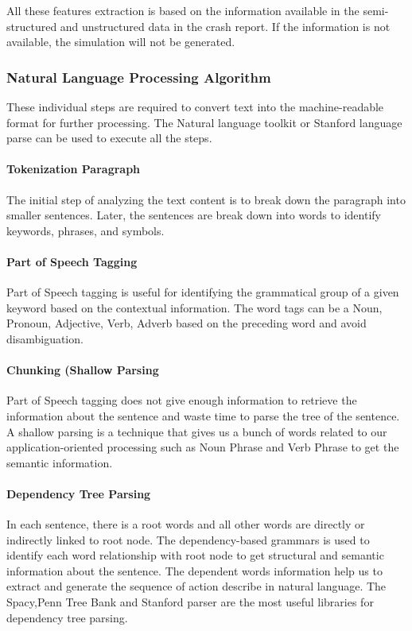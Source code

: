 All these features extraction is based on the information available in the semi-structured and unstructured data in the crash report. If the information is not available, the simulation will not be generated.

\subsubsection{Natural Language Processing Algorithm}
These individual steps are required to convert text into the machine-readable format for further processing.  The Natural language toolkit or Stanford language parse can be used to execute all the steps.

\paragraph{Tokenization Paragraph}
The initial step of analyzing the text content is to break down the paragraph into smaller sentences. Later, the sentences are break down into words to identify keywords, phrases, and symbols. 

\paragraph{Part of Speech Tagging}
Part of Speech tagging is useful for identifying the grammatical group of a given keyword based on the contextual information.  The word tags can be a Noun, Pronoun, Adjective, Verb, Adverb based on the preceding word and avoid disambiguation. 

\paragraph{Chunking (Shallow Parsing}
Part of Speech tagging does not give enough information to retrieve the information about the sentence and waste time to parse the tree of the sentence. A shallow parsing is a technique that gives us a bunch of words related to our application-oriented processing such as Noun Phrase and Verb Phrase to get the semantic information. 

\paragraph{Dependency Tree Parsing}
In each sentence, there is a root words and all other words are directly or indirectly linked to root node. The dependency-based grammars is used to identify each word relationship with root node to get structural and semantic information about the sentence. The dependent words information help us to extract and generate the sequence of action describe in natural language. The Spacy,Penn Tree Bank and Stanford parser are the most useful libraries for dependency tree parsing. 

